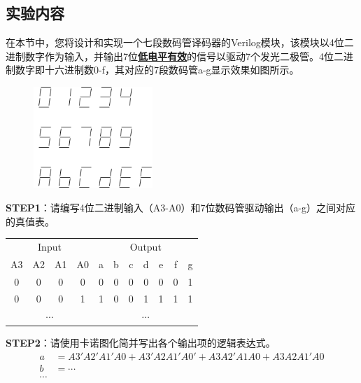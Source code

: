 \documentclass{ctexart}
\begin{document}
\subsection{实验内容}

在本节中，您将设计和实现一个七段数码管译码器的Verilog模块，该模块以4位二进制数字作为输入，并输出7位\underline{\textbf{低电平有效}}的信号以驱动7个发光二极管。4位二进制数字即十六进制数0-f，其对应的7段数码管a-g显示效果如图所示。

\begin{figure}[H]
    \centering
    \includegraphics[width=0.4\textwidth]{lab1/2.png}
\end{figure}

\textbf{STEP1}：请编写4位二进制输入（A3-A0）和7位数码管驱动输出（a-g）之间对应的真值表。

\begin{table}[H]
    \centering
    \begin{tabular}{ c c c c c c c c c c c }
        \hline
        \multicolumn{4}{c}{Input} & \multicolumn{7}{c}{Output} \\
        \cmidrule(r){1-4} \cmidrule(r){5-11}
        A3 & A2 & A1 & A0 & a & b & c & d & e & f & g \\
        \hline
        0 & 0 & 0 & 0 & 0 & 0 & 0 & 0 & 0 & 0 & 1 \\
        0 & 0 & 0 & 1 & 1 & 0 & 0 & 1 & 1 & 1 & 1 \\
        \multicolumn{4}{c}{$\cdots$} & \multicolumn{7}{c}{$\cdots$} \\
        \hline
    \end{tabular}
\end{table}

\textbf{STEP2}：请使用卡诺图化简并写出各个输出项的逻辑表达式。
\begin{equation*}
    \begin{aligned}
        a &= A3' A2' A1' A0 + A3' A2 A1' A0' + A3 A2' A1 A0 + A3 A2 A1' A0 \\
        b &= \cdots  \\
        \cdots
    \end{aligned}
\end{equation*}
\end{document}

